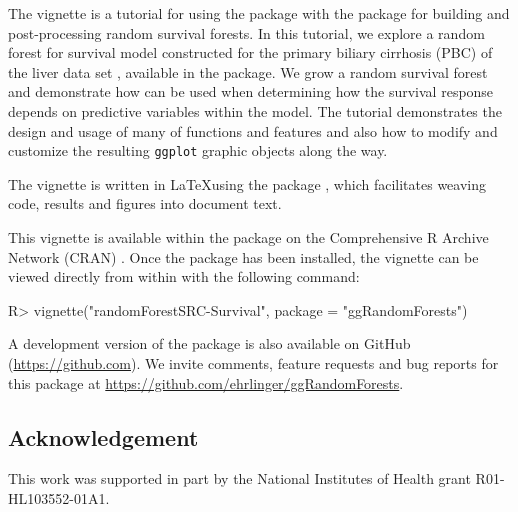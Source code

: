 \documentclass[article]{jss}
\begin{document}
The vignette is a tutorial for using the  package
with the  package for building and post-processing
random survival forests. In this tutorial, we explore a random forest
for survival model constructed for the primary biliary cirrhosis (PBC)
of the liver data set \citep{fleming:1991}, available in the
 package. We grow a random survival forest and
demonstrate how  can be used when determining how
the survival response depends on predictive variables within the model.
The tutorial demonstrates the design and usage of many of
 functions and features and also how to modify and
customize the resulting \texttt{ggplot} graphic objects along the way.

The vignette is written in \LaTeX using the  package
\citep[\url{http://CRAN.R-project.org/package=knitr}]{Xie:2015, Xie:2014,Xie:2013},
which facilitates weaving  \citep{rcore} code, results and
figures into document text.

This vignette is available within the  package on
the Comprehensive R Archive Network (CRAN)
\citep[\url{http://cran.r-project.org}]{rcore}. Once the package has
been installed, the vignette can be viewed directly from within
 with the following command:

\begin{Schunk}
\begin{Sinput}
R> vignette("randomForestSRC-Survival", package = "ggRandomForests")
\end{Sinput}
\end{Schunk}

A development version of the  package is also
available on GitHub (\url{https://github.com}). We invite comments,
feature requests and bug reports for this package at
\url{https://github.com/ehrlinger/ggRandomForests}.

\subsection{Acknowledgement}\label{acknowledgement}

This work was supported in part by the National Institutes of Health
grant R01-HL103552-01A1.

\renewcommand\refname{References}

\end{document}
